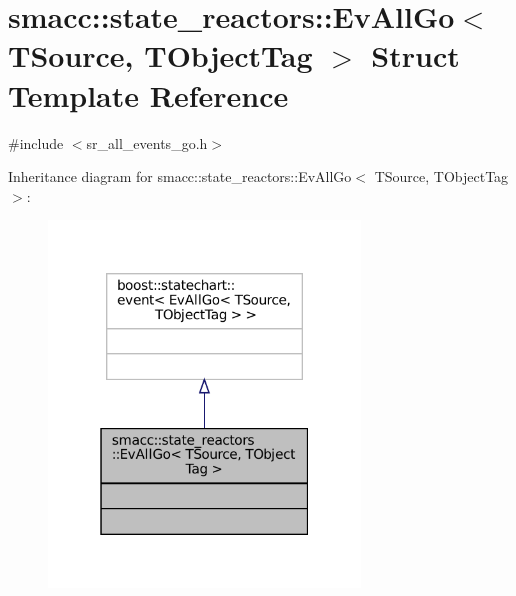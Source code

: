 \hypertarget{structsmacc_1_1state__reactors_1_1EvAllGo}{}\section{smacc\+:\+:state\+\_\+reactors\+:\+:Ev\+All\+Go$<$ T\+Source, T\+Object\+Tag $>$ Struct Template Reference}
\label{structsmacc_1_1state__reactors_1_1EvAllGo}


{\ttfamily \#include $<$sr\+\_\+all\+\_\+events\+\_\+go.\+h$>$}



Inheritance diagram for smacc\+:\+:state\+\_\+reactors\+:\+:Ev\+All\+Go$<$ T\+Source, T\+Object\+Tag $>$\+:
\nopagebreak
\begin{figure}[H]
\begin{center}
\leavevmode
\includegraphics[width=235pt]{structsmacc_1_1state__reactors_1_1EvAllGo__inherit__graph}
\end{center}
\end{figure}


